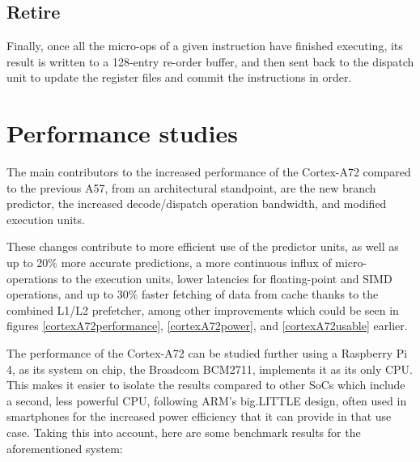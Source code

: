 \subsection*{Retire}
\hspace{\parindent}Finally, once all the micro-ops of a given instruction have finished executing, its result is written to a 128-entry re-order buffer, and then sent back to the dispatch unit to update the register files and commit the instructions in order.
\pagebreak{}
\section{Performance studies}
\hspace{\parindent}The main contributors to the increased performance of the Cortex-A72 compared to the previous A57, from an architectural standpoint, are the new branch predictor, the increased decode/dispatch operation bandwidth, and modified execution units. \par
These changes contribute to more efficient use of the predictor units, as well as up to 20\% more accurate predictions, a more continuous influx of micro-operations to the execution units, lower latencies for floating-point and SIMD operations, and up to 30\% faster fetching of data from cache thanks to the combined L1/L2 prefetcher, among other improvements which could be seen in figures \ref{cortexA72performance}, \ref{cortexA72power}, and \ref{cortexA72usable} earlier. \cite{androidauthority} \par
The performance of the Cortex-A72 can be studied further using a Raspberry Pi 4, as its system on chip, the Broadcom BCM2711, implements it as its only CPU. This makes it easier to isolate the results compared to other SoCs which include a second, less powerful CPU, following ARM's big.LITTLE design, often used in smartphones for the increased power efficiency that it can provide in that use case. Taking this into account, here are some benchmark results for the aforementioned system:
